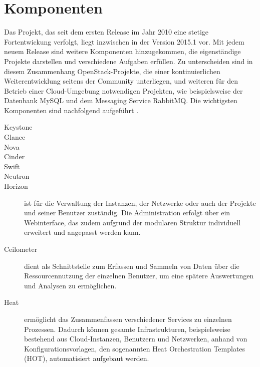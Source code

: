 \section{Komponenten}Das Projekt, das seit dem ersten Release im Jahr 2010 eine stetige Fortentwickung verfolgt, liegt inzwischen in der Version 2015.1 vor. Mit jedem neuem Release sind weitere Komponenten hinzugekommen, die eigenständige Projekte darstellen und verschiedene Aufgaben erfüllen. Zu unterscheiden sind in diesem Zusammenhang OpenStack-Projekte, die einer kontinuierlichen Weiterentwicklung seitens der Community unterliegen, und weiteren für den Betrieb einer Cloud-Umgebung notwendigen Projekten, wie beispielsweise der Datenbank MySQL und dem Messaging Service RabbitMQ. Die wichtigsten Komponenten sind nachfolgend aufgeführt \cite[vgl.][S. 20-28]{Beitter}.
\begin{description}
\item[Keystone]
\item[Glance]
\item[Nova]
\item[Cinder]
\item[Swift]
\item[Neutron]
\item[Horizon] ist für die Verwaltung der Instanzen, der Netzwerke oder auch der Projekte und seiner Benutzer zuständig. Die Administration erfolgt über ein Webinterface, das zudem aufgrund der modularen Struktur individuell erweitert und angepasst werden kann. 
\item[Ceilometer] dient als Schnittstelle zum Erfassen und Sammeln von Daten über die Ressourcennutzung der einzelnen Benutzer, um eine spätere Auswertungen und Analysen zu ermöglichen.
\item[Heat] ermöglicht das Zusammenfassen verschiedener Services zu einzelnen Prozessen. Dadurch können gesamte Infrastrukturen, beispielsweise bestehend aus Cloud-Instanzen, Benutzern und Netzwerken, anhand von Konfigurationsvorlagen, den sogenannten Heat Orchestration Templates (HOT), automatisiert aufgebaut werden.
\end{description}
